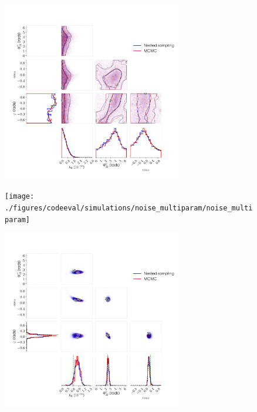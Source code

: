 \begin{figure}[phtb]
\begin{center}
\includegraphics[width=0.7\textwidth]{./figures/codeeval/simulations/noise_multidet/simulatednoisemultidettest}
\caption{ \protect}
\end{center}
\end{figure}


\begin{figure}[phtb]
\begin{center}
\texttt{[image: ./figures/codeeval/simulations/noise\_multiparam/noise\_multiparam]}
\caption{ \protect}
\end{center}
\end{figure}


\begin{figure}[phtb]
\begin{center}
\includegraphics[width=0.7\textwidth]{./figures/codeeval/simulations/signal/simulatedsignaltest}
\caption{ \protect}
\end{center}
\end{figure}


